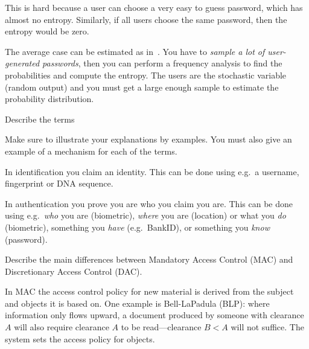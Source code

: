 \documentclass[a4paper,addpoints]{exam}
\begin{document}
\begin{questions}
\begin{solution}
    This is hard because a user can choose a very easy to guess password, which 
    has almost no entropy.
    Similarly, if all users choose the same password, then the entropy would be 
    zero.

    The average case can be estimated as in~\cite{Komanduri2011opa}.
    You have to \emph{sample a lot of user-generated passwords}, then you can 
    perform a frequency analysis to find the probabilities and compute the 
    entropy.
    The users are the stochastic variable (random output) and you must get 
    a large enough sample to estimate the probability distribution.
  \end{solution}


  \question\label{q:auth:E:C}
  Describe the terms
  Make sure to illustrate your explanations by examples.
  You must also give an example of a mechanism for each of the terms.

  \begin{solution}
    In identification you claim an identity.
    This can be done using e.g.~a username, fingerprint or DNA sequence.

    In authentication you prove you are who you claim you are.
    This can be done using e.g.~\emph{who} you are (biometric), \emph{where} 
    you are (location) or what you \emph{do} (biometric), something you 
    \emph{have} (e.g.~BankID), or something you \emph{know} (password).
  \end{solution}


  \question[4]\label{q:accessctrl:E}
  Describe the main differences between Mandatory Access Control (MAC) and 
  Discretionary Access Control (DAC).

  \begin{solution}
    In MAC the access control policy for new material is derived from the 
    subject and objects it is based on.
    One example is Bell-LaPadula (BLP): where information only flows upward, 
    a document produced by someone with clearance \(A\) will also require 
    clearance \(A\) to be read---clearance \(B<A\) will not suffice.
    The system sets the access policy for objects.


\end{solution}
\end{questions}
\end{document}
